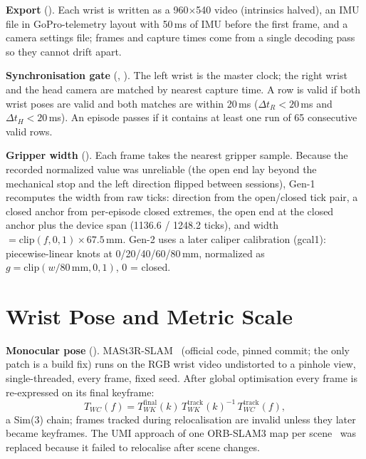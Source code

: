 \documentclass[conference,10pt]{IEEEtran}
\newcommand{\mm}{\,mm\xspace}
\begin{document}
\textbf{Export} (). Each wrist is written as a 960$\times$540 video (intrinsics
halved), an IMU file in GoPro-telemetry layout with 50\,ms of IMU before the first frame, and a camera settings file; frames and
capture times come from a single decoding pass so they cannot drift apart.

\textbf{Synchronisation gate} (, ). The left wrist is the master
clock; the right wrist and the head camera are matched by nearest capture time. A row is valid if both wrist poses are valid and
both matches are within 20\,ms ($\Delta t_R<20$\,ms and $\Delta t_H<20$\,ms). An episode passes if it contains at
least one run of 65 consecutive valid rows.

\textbf{Gripper width} (). Each frame takes the nearest gripper sample. Because the recorded normalized value
was unreliable (the open end lay beyond the mechanical stop and the left direction flipped between sessions), Gen-1 recomputes
the width from raw ticks: direction from the open/closed tick pair, a closed anchor from per-episode closed extremes, the open end
at the closed anchor plus the device span (1136.6 / 1248.2 ticks), and width $= \mathrm{clip}(f,0,1)\times 67.5$\mm. Gen-2 uses a
later caliper calibration (gcal1): piecewise-linear knots at 0/20/40/60/80\mm, normalized as $g=\mathrm{clip}(w/80\,\text{mm},0,1)$,
0 = closed.

\section{Wrist Pose and Metric Scale}\label{m:sec:pose}
\textbf{Monocular pose} (). MASt3R-SLAM~\cite{murai2025mast3rslam} (official
code, pinned commit; the only patch is a build fix) runs on the RGB wrist video undistorted to a pinhole view, single-threaded,
every frame, fixed seed. After global optimisation every frame is re-expressed on its final keyframe:
\begin{equation}
T_{WC}(f) = T_{WK}^{\text{final}}(k)\,T_{WK}^{\text{track}}(k)^{-1}\,T_{WC}^{\text{track}}(f),
\end{equation}
a Sim(3) chain; frames tracked during relocalisation are invalid unless they later became keyframes. The UMI approach of one
ORB-SLAM3 map per scene~\cite{chi2024umi} was replaced because it failed to relocalise after scene changes.
\end{document}
